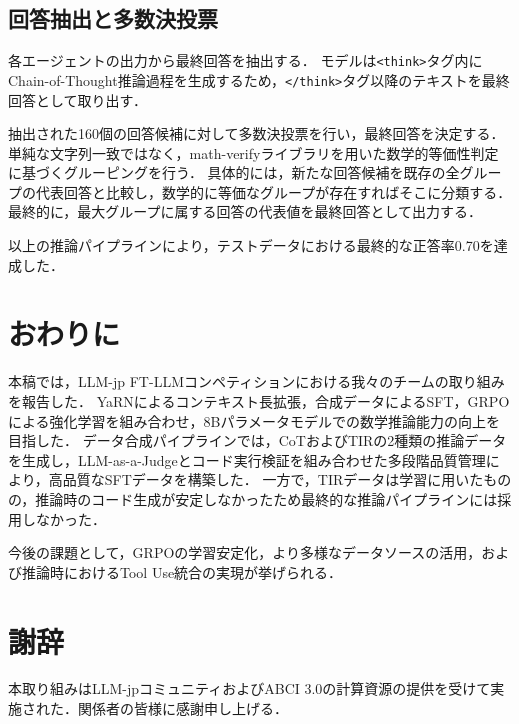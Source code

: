 \documentclass[
  platex, dvipdfmx,  %
]{nlp2026}
\newcommand{\code}[1]{\texttt{#1}}
\begin{document}
\subsection{回答抽出と多数決投票}

各エージェントの出力から最終回答を抽出する．
モデルは\code{<think>}タグ内にChain-of-Thought推論過程を生成するため，\code{</think>}タグ以降のテキストを最終回答として取り出す．

抽出された160個の回答候補に対して多数決投票を行い，最終回答を決定する．
単純な文字列一致ではなく，math-verifyライブラリを用いた数学的等価性判定に基づくグルーピングを行う．
具体的には，新たな回答候補を既存の全グループの代表回答と比較し，数学的に等価なグループが存在すればそこに分類する．
最終的に，最大グループに属する回答の代表値を最終回答として出力する．

以上の推論パイプラインにより，テストデータにおける最終的な正答率0.70を達成した．

\section{おわりに}

本稿では，LLM-jp FT-LLMコンペティションにおける我々のチームの取り組みを報告した．
YaRNによるコンテキスト長拡張，合成データによるSFT，GRPOによる強化学習を組み合わせ，8Bパラメータモデルでの数学推論能力の向上を目指した．
データ合成パイプラインでは，CoTおよびTIRの2種類の推論データを生成し，LLM-as-a-Judgeとコード実行検証を組み合わせた多段階品質管理により，高品質なSFTデータを構築した．
一方で，TIRデータは学習に用いたものの，推論時のコード生成が安定しなかったため最終的な推論パイプラインには採用しなかった．

今後の課題として，GRPOの学習安定化，より多様なデータソースの活用，および推論時におけるTool Use統合の実現が挙げられる．


\newpage
\section*{謝辞}
本取り組みはLLM-jpコミュニティおよびABCI 3.0の計算資源の提供を受けて実施された．関係者の皆様に感謝申し上げる．







\clearpage
\appendix
\end{document}
